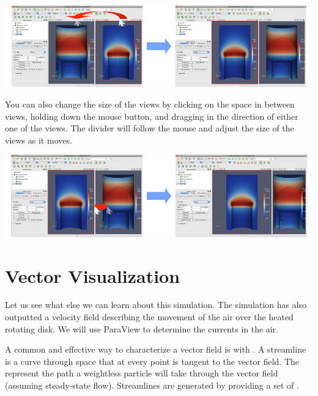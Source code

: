\begin{inlinefig}
  \includegraphics[width=\linewidth]{images/SwapViews}
\end{inlinefig}

You can also change the size of the views by clicking on the space in
between views, holding down the mouse button, and dragging in the direction
of either one of the views.  The divider will follow the mouse and adjust
the size of the views as it moves.

\begin{inlinefig}
  \includegraphics[width=\linewidth]{images/ResizeViews}
\end{inlinefig}


\section{Vector Visualization}

Let us see what else we can learn about this simulation.  The simulation
has also outputted a velocity field describing the movement of the air over
the heated rotating disk.  We will use ParaView to determine the currents
in the air.

A common and effective way to characterize a vector field is with
.  A streamline is a curve through space that at every
point is tangent to the vector field.  The represent the path a weightless
particle will take through the vector field (assuming steady-state flow).
Streamlines are generated by providing a set of
 .

